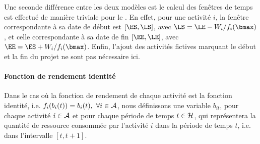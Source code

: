 Une seconde différence entre les deux modèles est le calcul des 
fenêtres de temps est effectué de manière triviale pour le \CECSP. 
En effet, pour une activité $i$,
la fenêtre correspondante à sa date de début est $[\ES,\LS]$, avec
$\LS=\LE-W_i/f_i(\bmax)$, et celle correspondante à sa date de fin
$[\EE,\LE]$, avec $\EE=\ES+W_i/f_i(\bmax)$. Enfin, l'ajout des
activités fictives marquant le début et la fin du projet ne sont
pas nécessaire ici.

\paragraph{Fonction de rendement identité}

Dans le cas où la fonction de rendement de chaque activité est la
fonction identité, i.e. $f_i(b_i(t))=b_i(t),\ \forall i \in \A$, nous
définissons une variable $b_{it}$, pour chaque activité $i \in {\cal A}$ et
pour chaque période de temps $t \in {\cal H}$, qui représentera la quantité
de ressource consommée par l'activité $i$ dans la période de temps
$t$, i.e. dans l'intervalle $[t,t+1]$.

